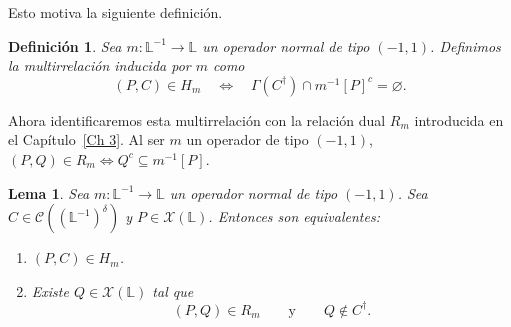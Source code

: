 \documentclass[12pt]{book}
\newtheorem{lemma}[theorem]{Lema}
\newtheorem{definition}[theorem]{Definición}
\begin{document}
Esto motiva la siguiente definición.

\begin{definition}
Sea $m:\mathbb L^{-1}\to\mathbb L$ un operador normal de tipo $(-1,1)$.
Definimos la multirrelación inducida por $m$ como
\[
(P,C)\in H_m
\quad\Longleftrightarrow\quad
\Gamma(C^{\dagger})\cap m^{-1}[P]^{c}=\varnothing.
\]
\end{definition}
Ahora identificaremos esta multirrelación con la relación dual $R_m$ introducida en el Capítulo~\ref{Ch 3}. Al ser $m$ un operador de tipo \((-1,1)\), $(P,Q)\in R_m\iff Q^c\subseteq m^{-1}[P]$.
\begin{lemma}\label{lem:M-R-estrella}
Sea $m:\mathbb L^{-1}\to\mathbb L$ un operador normal de tipo $(-1,1)$.
Sea $C\in\mathcal{C}((\mathbb{L}^{-1})^\delta)$ y 
$P\in\mathcal X(\mathbb L)$.
Entonces son equivalentes:
\begin{enumerate}
    \item $(P,C)\in H_m$.
    \item Existe $Q\in\mathcal X(\mathbb L)$ tal que
    \[
    (P,Q)\in R_m
    \qquad\text{y}\qquad
    Q\notin C^{\dagger}.
    \]
\end{enumerate}
\end{lemma}
\end{document}
